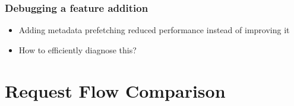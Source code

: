 \documentclass[11pt]{beamer}
\begin{document}
\begin{frame}
\frametitle{Debugging a feature addition}
\begin{itemize}
  \item<1>Adding metadata prefetching reduced performance instead of improving
  it
  \vskip18pt
  \item<2>How to efficiently diagnose this?
\end{itemize}
\end{frame}

\section{Request Flow Comparison}

\end{document}
